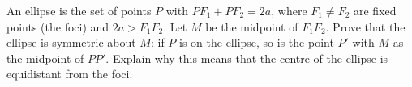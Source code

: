 An ellipse is the set of points $P$ with $PF_1+PF_2=2a$, where $F_1\ne F_2$ are fixed points (the foci) and $2a>F_1F_2$. Let $M$ be the midpoint of $F_1F_2$. Prove that the ellipse is symmetric about $M$: if $P$ is on the ellipse, so is the point $P'$ with $M$ as the midpoint of $PP'$. Explain why this means that the centre of the ellipse is equidistant from the foci.
